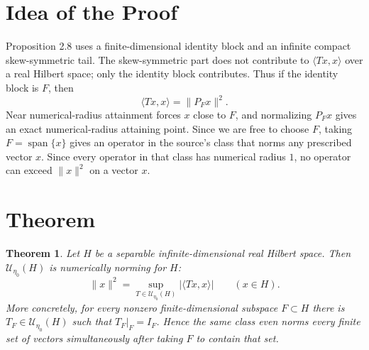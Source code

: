 \documentclass[11pt]{article}
\newtheorem{theorem}{Theorem}
\begin{document}
\section*{Idea of the Proof}

Proposition 2.8 uses a finite-dimensional identity block and an infinite compact skew-symmetric tail. The skew-symmetric part does not contribute to \(\langle Tx,x\rangle\) over a real Hilbert space; only the identity block contributes. Thus if the identity block is \(F\), then
\[
\langle Tx,x\rangle=\|P_Fx\|^2.
\]
Near numerical-radius attainment forces \(x\) close to \(F\), and normalizing \(P_Fx\) gives an exact numerical-radius attaining point. Since we are free to choose \(F\), taking \(F=\operatorname{span}\{x\}\) gives an operator in the source's class that norms any prescribed vector \(x\).  Since every operator in that class has numerical radius \(1\), no operator can exceed \(\|x\|^2\) on a vector \(x\).

\section*{Theorem}

\begin{theorem}
Let \(H\) be a separable infinite-dimensional real Hilbert space. Then
\(\mathscr U_{\eta_0}(H)\) is numerically norming for \(H\):
\[
\|x\|^2=\sup_{T\in\mathscr U_{\eta_0}(H)}|\langle Tx,x\rangle|
\qquad (x\in H).
\]
More concretely, for every nonzero finite-dimensional subspace \(F\subset H\)
there is \(T_F\in\mathscr U_{\eta_0}(H)\) such that \(T_F|_F=I_F\).  Hence the
same class even norms every finite set of vectors simultaneously after taking
\(F\) to contain that set.
\end{theorem}
\end{document}
